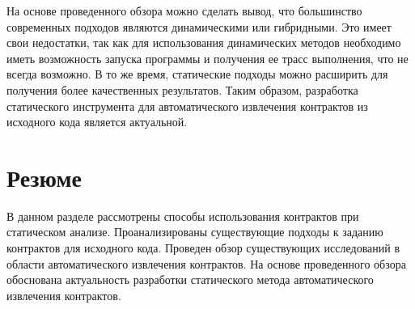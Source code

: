 На основе проведенного обзора можно сделать вывод, что большинство современных подходов являются динамическими или гибридными. Это имеет свои недостатки, так как для использования динамических методов необходимо иметь возможность запуска программы и получения ее трасс выполнения, что не всегда возможно. В то же время,  статические подходы можно расширить для получения более качественных результатов. Таким образом, разработка статического инструмента для автоматического извлечения контрактов из исходного кода является актуальной.

\section{Резюме}
В данном разделе рассмотрены способы использования контрактов при статическом анализе. Проанализированы существующие подходы к заданию контрактов для исходного кода. Проведен обзор существующих исследований в области автоматического извлечения контрактов. На основе проведенного обзора обоснована актуальность разработки статического метода автоматического извлечения контрактов.